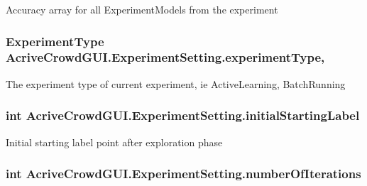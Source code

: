 Accuracy array for all Experiment\+Models from the experiment 

\hypertarget{class_acrive_crowd_g_u_i_1_1_experiment_setting_a4063f11ac4e345ecbee8a5e291a397e7}{}
\subsubsection[{experiment\+Type}]{\setlength{\rightskip}{0pt plus 5cm}Experiment\+Type Acrive\+Crowd\+G\+U\+I.\+Experiment\+Setting.\+experiment\+Type\hspace{0.3cm}{\ttfamily [get]}, {\ttfamily [set]}}\label{class_acrive_crowd_g_u_i_1_1_experiment_setting_a4063f11ac4e345ecbee8a5e291a397e7}


The experiment type of current experiment, ie Active\+Learning, Batch\+Running 

\hypertarget{class_acrive_crowd_g_u_i_1_1_experiment_setting_a85910797cd67b7f06b34ddef708daf8b}{}
\subsubsection[{initial\+Starting\+Label}]{\setlength{\rightskip}{0pt plus 5cm}int Acrive\+Crowd\+G\+U\+I.\+Experiment\+Setting.\+initial\+Starting\+Label\hspace{0.3cm}{\ttfamily [get]}}\label{class_acrive_crowd_g_u_i_1_1_experiment_setting_a85910797cd67b7f06b34ddef708daf8b}


Initial starting label point after exploration phase 

\hypertarget{class_acrive_crowd_g_u_i_1_1_experiment_setting_a21043775ebb676571dd367a3d2afabf0}{}
\subsubsection[{number\+Of\+Iterations}]{\setlength{\rightskip}{0pt plus 5cm}int Acrive\+Crowd\+G\+U\+I.\+Experiment\+Setting.\+number\+Of\+Iterations\hspace{0.3cm}{\ttfamily [get]}}\label{class_acrive_crowd_g_u_i_1_1_experiment_setting_a21043775ebb676571dd367a3d2afabf0}


